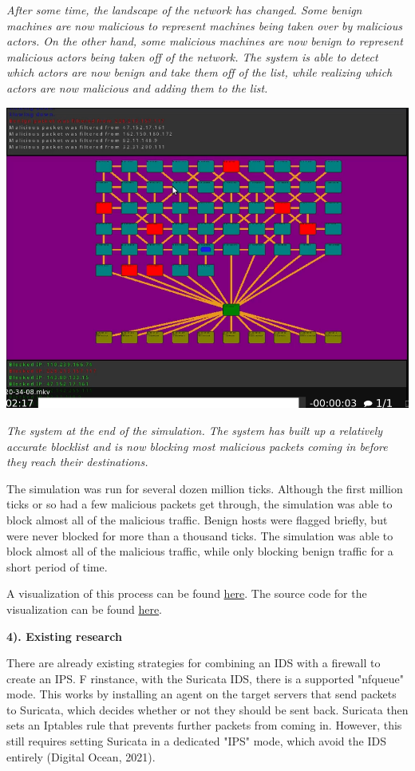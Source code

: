 \documentclass[12pt]{article}
\begin{document}
\begin{flushleft}
\begin{multicols}{2}
\textit{After some time, the landscape of the network has changed. Some benign machines are now malicious to represent machines being taken over by malicious actors. On the other hand, some malicious machines are now benign to represent malicious actors being taken off of the network. The system is able to detect which actors are now benign and take them off of the list, while realizing which actors are now malicious and adding them to the list.}

\includegraphics[scale=0.20]{screenshot7.png}

\textit{The system at the end of the simulation. The system has built up a relatively accurate blocklist and is now blocking most malicious packets coming in before they reach their destinations.}

The simulation was run for several dozen million ticks. Although the first million ticks or so had a few malicious packets get through, the simulation was able to block almost all of the malicious traffic. Benign hosts were flagged briefly, but were never blocked for more than a thousand ticks. The simulation was able to block almost all of the malicious traffic, while only blocking benign traffic for a short period of time.

A visualization of this process can be found \href{https://youtu.be/-2nSqtbwnJU}{here}. The source code for the visualization can be found \href{https://github.com/notgull/cs-645-final-project}{here}.

\textbf{4). Existing research}

There are already existing strategies for combining an IDS with a firewall to create an IPS. F rinstance, with the Suricata IDS, there is a supported "nfqueue" mode. This works by installing an agent on the target servers that send packets to Suricata, which decides whether or not they should be sent back. Suricata then sets an Iptables rule that prevents further packets from coming in. However, this still requires setting Suricata in a dedicated "IPS" mode, which avoid the IDS entirely (Digital Ocean, 2021).


\end{multicols}
\end{flushleft}
\end{document}
